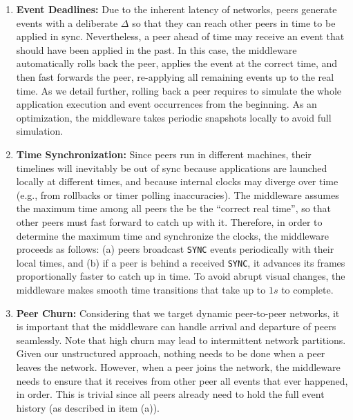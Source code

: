 \documentclass[sn-mathphys,iicol]{sn-jnl}%
\newcommand{\code}[1]  {\texttt{\small{#1}}}
\begin{document}
\begin{enumerate}
\item \textbf{Event Deadlines:}
Due to the inherent latency of networks, peers generate events with a
deliberate $\Delta$ so that they can reach other peers in time to be applied in
sync.
Nevertheless, a peer ahead of time may receive an event that should have been
applied in the past. %
In this case, the middleware automatically rolls back the peer, applies the
event at the correct time, and then fast forwards the peer, re-applying all
remaining events up to the real time.
As we detail further, rolling back a peer requires to simulate the whole
application execution and event occurrences from the beginning.
As an optimization, the middleware takes periodic snapshots locally to avoid
full simulation.
%
\item \textbf{Time Synchronization:}
Since peers run in different machines, their timelines will inevitably be out
of sync because applications are launched locally at different times, and
because internal clocks may diverge over time (e.g., from rollbacks or timer
polling inaccuracies).
The middleware assumes the maximum time among all peers the be the
``correct real time'', so that other peers must fast forward to catch up with
it.
Therefore, in order to determine the maximum time and synchronize the clocks,
the middleware proceeds as follows:
    (a) peers broadcast \code{SYNC} events periodically with their local
        times, and
    (b) if a peer is behind a received \code{SYNC}, it advances its frames
        proportionally faster to catch up in time.
%
To avoid abrupt visual changes, the middleware makes smooth time transitions
that take up to $1s$ to complete.
%
\item \textbf{Peer Churn:}
Considering that we target dynamic peer-to-peer networks, it is important that
the middleware can handle arrival and departure of peers seamlessly.
Note that high churn may lead to intermittent network partitions.
Given our unstructured approach, nothing needs to be done when a peer leaves
the network.
However, when a peer joins the network, the middleware needs to ensure that it
receives from other peer all events that ever happened, in order.
This is trivial since all peers already need to hold the full event history (as
described in item (a)).
\end{enumerate}
\end{document}
